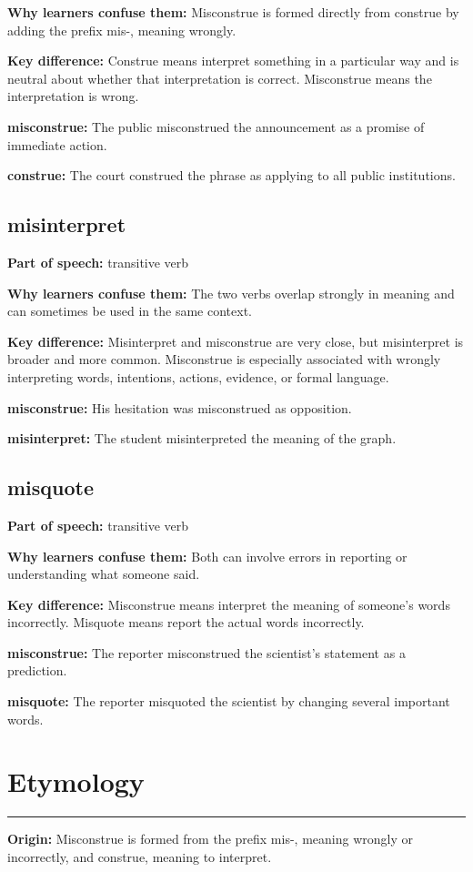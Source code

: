 \documentclass[11pt]{article}
\newcommand{\sectionrule}{\par\vspace{-0.5em}\noindent\textcolor{Accent}{\rule{\linewidth}{0.6pt}}\par}
\begin{document}
\textbf{Why learners confuse them:} Misconstrue is formed directly from construe by adding the prefix mis-, meaning wrongly.

\textbf{Key difference:} Construe means interpret something in a particular way and is neutral about whether that interpretation is correct. Misconstrue means the interpretation is wrong.

\textbf{misconstrue:} The public misconstrued the announcement as a promise of immediate action.

\textbf{construe:} The court construed the phrase as applying to all public institutions.

\subsection{misinterpret}
\textbf{Part of speech:} transitive verb

\textbf{Why learners confuse them:} The two verbs overlap strongly in meaning and can sometimes be used in the same context.

\textbf{Key difference:} Misinterpret and misconstrue are very close, but misinterpret is broader and more common. Misconstrue is especially associated with wrongly interpreting words, intentions, actions, evidence, or formal language.

\textbf{misconstrue:} His hesitation was misconstrued as opposition.

\textbf{misinterpret:} The student misinterpreted the meaning of the graph.

\subsection{misquote}
\textbf{Part of speech:} transitive verb

\textbf{Why learners confuse them:} Both can involve errors in reporting or understanding what someone said.

\textbf{Key difference:} Misconstrue means interpret the meaning of someone's words incorrectly. Misquote means report the actual words incorrectly.

\textbf{misconstrue:} The reporter misconstrued the scientist's statement as a prediction.

\textbf{misquote:} The reporter misquoted the scientist by changing several important words.

\section{Etymology}
\sectionrule
\textbf{Origin:} Misconstrue is formed from the prefix mis-, meaning wrongly or incorrectly, and construe, meaning to interpret.
\end{document}
